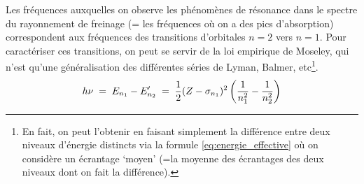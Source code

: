 Les fréquences auxquelles on observe les phénomènes de résonance dans le spectre du rayonnement de freinage (= les fréquences où on a des pics d'absorption) correspondent aux fréquences des transitions d'orbitales $n = 2$ vers $n = 1$. Pour caractériser ces transitions, on peut se servir de la loi empirique de Moseley, qui n'est qu'une généralisation des différentes séries de Lyman, Balmer, etc\footnote{En fait, on peut l'obtenir en faisant simplement la différence entre deux niveaux d'énergie distincts via la formule \ref{eq:energie_effective} où on considère un écrantage `moyen' (=la moyenne des écrantages des deux niveaux dont on fait la différence).}.
\begin{equation}
    h\nu
    \; = \; E_{n_1} - E'_{n_2}
    \; = \; \dfrac{1}{2}(Z-\sigma_{n_1})^2\left(\dfrac{1}{n_1^2}-\dfrac{1}{n_2^2}\right)
    \label{eq:Moseley}
\end{equation}

